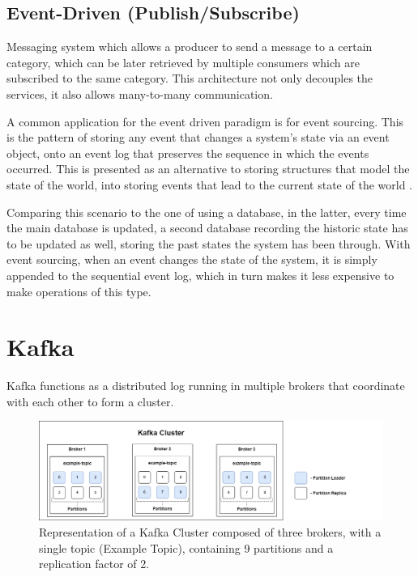 \subsection{Event-Driven (Publish/Subscribe)}

Messaging system which allows a producer to send a message to a certain category,
which can be later retrieved by multiple consumers which are subscribed to
the same category. This architecture not only decouples the services, it also
allows many-to-many communication.

A common application for the event driven paradigm is for event sourcing. This
is the pattern of storing any event that changes a system's state via an event
object, onto an event log that preserves the sequence in which the events
occurred. This is presented as an alternative to storing structures that model
the state of the world, into storing events that lead to the current state of
the world \cite[Chapter~5]{nadareishvili2016microservice}.

Comparing this scenario to the one of using a database, in the latter, every
time the main database is updated, a second database recording the historic
state has to be updated as well, storing the past states the system has been
through. With event sourcing, when an event changes the state of the system, it
is simply appended to the sequential event log, which in turn makes it less
expensive to make operations of this type.

\section{Kafka}

Kafka functions as a distributed log running in multiple brokers that coordinate
with each other to form a cluster.

\begin{figure}[H] 
    \centering
    \includegraphics[width=\textwidth]{images/infrastructure/Kafka Cluster.png}
    \caption{
        Representation of a Kafka Cluster composed of three brokers, with a
        single topic (Example Topic), containing 9 partitions and a
        replication factor of 2.
    } 
    \label{fig:kafka_cluster} 
\end{figure}

